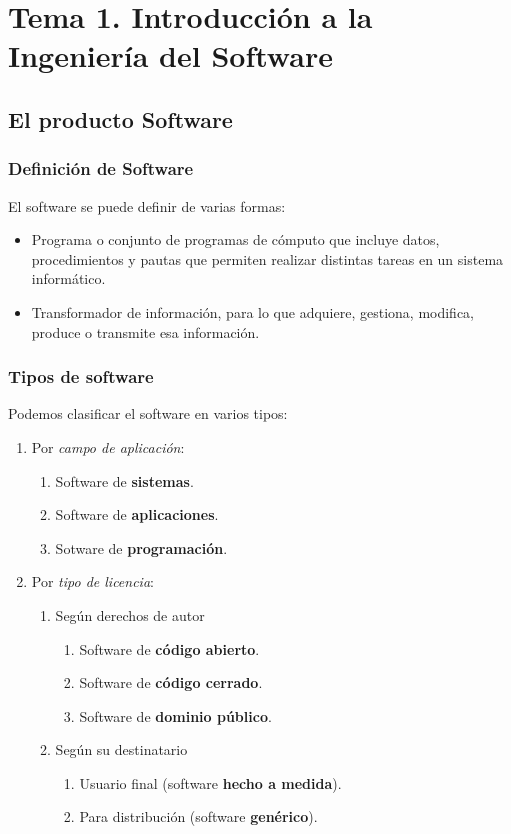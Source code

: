 \documentclass[12pt,spanish]{article}
\begin{document}
\section{Tema 1. Introducción a la Ingeniería del Software}

\subsection{El producto Software}

\subsubsection{Definición de Software}

El software se puede definir de varias formas:
\begin{itemize}
\item Programa o conjunto de programas de cómputo que incluye datos, procedimientos y pautas que permiten realizar distintas tareas en un sistema informático.
\item Transformador de información, para lo que adquiere, gestiona, modifica, produce o transmite esa información.
\end{itemize}

\subsubsection{Tipos de software}

Podemos clasificar el software en varios tipos:
\begin{enumerate}
	\item Por \emph{campo de aplicación}:
		\begin{enumerate}
			\item Software de \textbf{sistemas}.
			\item Software de \textbf{aplicaciones}.
			\item Sotware de \textbf{programación}.
		\end{enumerate}
	\item Por \emph{tipo de licencia}:
		\begin{enumerate}
			\item Según derechos de autor
				\begin{enumerate}
					\item Software de \textbf{código abierto}.
					\item Software de \textbf{código cerrado}.
					\item Software de \textbf{dominio público}.
				\end{enumerate}
			\item Según su destinatario
				\begin{enumerate}
					\item Usuario final (software \textbf{hecho a medida}).
					\item Para distribución (software \textbf{genérico}).
				\end{enumerate}
		\end{enumerate}
\end{enumerate}
\end{document}
